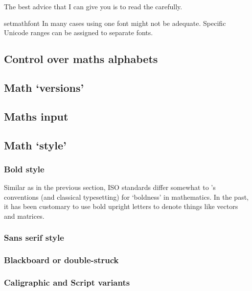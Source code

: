The best advice that I can give you is to read the  carefully. 

\begin{docCommand} {setmathfont} {   }
In many cases using one font might not be adequate. Specific Unicode ranges can be assigned to separate fonts.
\end{docCommand}

\subsection{Control over maths alphabets}

\subsection{Math `versions'}

\subsection{Maths input}

\subsection{Math `style'}

\subsubsection{Bold style}

Similar as in the previous section, ISO standards differ somewhat to \tex’s conventions
(and classical typesetting) for ‘boldness’ in mathematics. In the past, it has
been customary to use bold upright letters to denote things like vectors and matrices.

\subsubsection{Sans serif style}

\subsubsection{Blackboard or double-struck}

\subsubsection{Caligraphic and Script variants}

